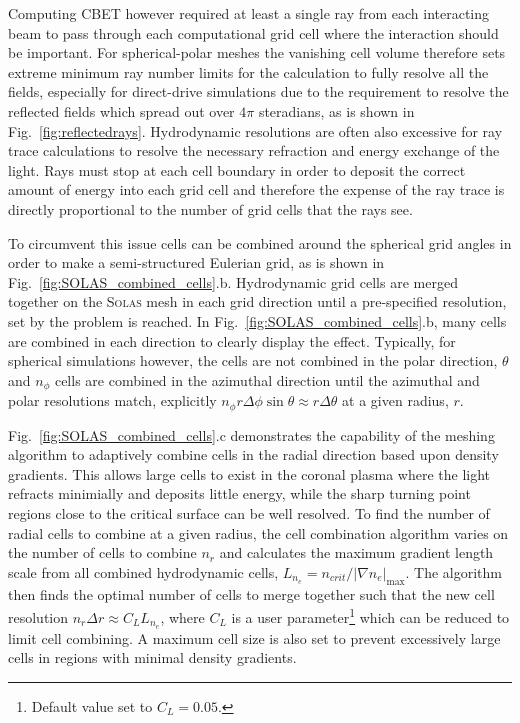 Computing \ac{CBET} however required at least a single ray from each interacting beam to pass through each computational grid cell where the interaction should be important.
For spherical-polar meshes the vanishing cell volume therefore sets extreme minimum ray number limits for the calculation to fully resolve all the fields, especially for direct-drive simulations due to the requirement to resolve the reflected fields which spread out over $4\pi$ steradians, as is shown in Fig.~\ref{fig:reflectedrays}.
Hydrodynamic resolutions are often also excessive for ray trace calculations to resolve the necessary refraction and energy exchange of the light.
Rays must stop at each cell boundary in order to deposit the correct amount of energy into each grid cell and therefore the expense of the ray trace is directly proportional to the number of grid cells that the rays see.

To circumvent this issue cells can be combined around the spherical grid angles in order to make a semi-structured Eulerian grid, as is shown in Fig.~\ref{fig:SOLAS_combined_cells}.b.
Hydrodynamic grid cells are merged together on the \textsc{Solas} mesh in each grid direction until a pre-specified resolution, set by the problem is reached.
In Fig.~\ref{fig:SOLAS_combined_cells}.b, many cells are combined in each direction to clearly display the effect.
Typically, for spherical simulations however, the cells are not combined in the polar direction, $\theta$ and $n_{\phi}$ cells are combined in the azimuthal direction until the azimuthal and polar resolutions match, explicitly $n_{\phi}r\Delta\phi\sin\theta \approx r \Delta\theta$ at a given radius, $r$.

Fig.~\ref{fig:SOLAS_combined_cells}.c demonstrates the capability of the meshing algorithm to adaptively combine cells in the radial direction based upon density gradients.
This allows large cells to exist in the coronal plasma where the light refracts minimially and deposits little energy, while the sharp turning point regions close to the critical surface can be well resolved.
To find the number of radial cells to combine at a given radius, the cell combination algorithm varies on the number of cells to combine $n_r$ and calculates the maximum gradient length scale from all combined hydrodynamic cells, $L_{n_e}=n_{crit}/|\nabla n_e|_{\max}$.
The algorithm then finds the optimal number of cells to merge together such that the new cell resolution $n_r\Delta r \approx C_L L_{n_e}$, where $C_L$ is a user parameter\footnote{Default value set to $C_L=0.05$.} which can be reduced to limit cell combining.
A maximum cell size is also set to prevent excessively large cells in regions with minimal density gradients.

